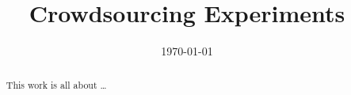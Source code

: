 \documentclass{ecsreport}      %
\begin{document}
\frontmatter
\title      {Crowdsourcing Experiments}
\addresses  {\groupname\\\deptname\\\univname}
\date       {\today}
\subject    {}
\keywords   {}
\maketitle
\begin{abstract}
This work is all about \dots
\end{abstract}
\tableofcontents
\listoffigures
\listoftables

\newcommand{\funcx}{\ensuremath{f(x)}}
\newcommand{\probx}{\ensuremath{p(x)}}
\newcommand{\propx}{\ensuremath{q(x)}}
\newcommand{\expectation}[1]{\ensuremath{\mathbb{E}[#1]}}
\newcommand{\sample}[2][x]{\ensuremath{#1^{(#2)}}}
\newcommand{\approxiw}[2][x]{\ensuremath{\tilde{w}(\sample[#1]{#2})}}
\newcommand{\normiw}[2][x]{\ensuremath{\ensuremath{w(\sample[#1]{#2})}}}





\mainmatter
%
%
%
%
%
%

\appendix

\backmatter


\end{document}
